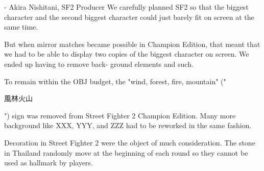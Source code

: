 \begin{q}{- Akira Nishitani, SF2 Producer}
We carefully planned SF2 so that the biggest character and the second biggest character could just barely fit on screen at the same time. 

But when mirror matches became possible in Champion Edition, that meant that we had to be able to display two copies of the biggest character on screen. We ended up having to remove back- ground elements and such.
\end{q}
To remain within the OBJ budget, the "wind, forest, fire, mountain" ("\begin{CJK}{UTF8}{min}風林火山\end{CJK}") sign was removed from Street Fighter 2 Champion Edition. Many more background like XXX, YYY, and ZZZ had to be reworked in the same fashion.

\begin{trivia}
Decoration in Street Fighter 2 were the object of much consideration. The stone in Thailand randomly move at the beginning of each round so they cannot be used as hallmark by players.

\end{trivia}

\vfill
{}


\begin{minipage}[t]{0.32\linewidth}
\end{minipage}%
\hfill%
\begin{minipage}[t]{0.32\linewidth}
\end{minipage}
\hfill%
\begin{minipage}[t]{0.32\linewidth}
\end{minipage}

\begin{minipage}[t]{0.32\linewidth}
\end{minipage}%
\hfill%
\begin{minipage}[t]{0.32\linewidth}
\end{minipage}
\hfill%
\begin{minipage}[t]{0.32\linewidth}
\end{minipage}

\begin{minipage}[t]{0.32\linewidth}
\end{minipage}%
\hfill%
\begin{minipage}[t]{0.32\linewidth}
\end{minipage}
\hfill%
\begin{minipage}[t]{0.32\linewidth}
\end{minipage}

